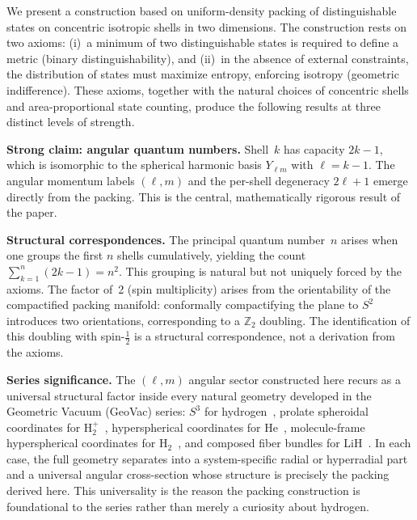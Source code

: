 \documentclass[aps,prl,reprint,amsmath,amssymb]{revtex4-2}
\begin{document}
We present a construction based on uniform-density packing of
distinguishable states on concentric isotropic shells in two
dimensions.  The construction rests on two axioms:
(i)~a minimum of two distinguishable states is required to define a
metric (binary distinguishability), and (ii)~in the absence of
external constraints, the distribution of states must maximize
entropy, enforcing isotropy (geometric indifference).  These axioms,
together with the natural choices of concentric shells and
area-proportional state counting, produce the following results at
three distinct levels of strength.

\medskip

\noindent\textbf{Strong claim: angular quantum numbers.}  Shell~$k$
has capacity $2k - 1$, which is isomorphic to the spherical harmonic
basis $Y_{\ell m}$ with $\ell = k - 1$.  The angular momentum labels
$(\ell, m)$ and the per-shell degeneracy $2\ell + 1$ emerge directly
from the packing.  This is the central, mathematically rigorous result
of the paper.

\medskip

\noindent\textbf{Structural correspondences.}  The principal quantum
number~$n$ arises when one groups the first $n$ shells cumulatively,
yielding the count $\sum_{k=1}^{n}(2k-1) = n^2$.  This grouping is
natural but not uniquely forced by the axioms.  The factor of~2 (spin
multiplicity) arises from the orientability of the compactified
packing manifold: conformally compactifying the plane to $S^2$
introduces two orientations, corresponding to a $\mathbb{Z}_2$
doubling.  The identification of this doubling with
spin-$\tfrac{1}{2}$ is a structural correspondence, not a derivation
from the axioms.

\medskip

\noindent\textbf{Series significance.}  The $(\ell, m)$ angular
sector constructed here recurs as a universal structural factor inside
every natural geometry developed in the Geometric Vacuum (GeoVac)
series: $S^3$ for hydrogen~\cite{paper7}, prolate spheroidal
coordinates for H$_2^+$~\cite{paper11}, hyperspherical coordinates for
He~\cite{paper13}, molecule-frame hyperspherical coordinates for
H$_2$~\cite{paper15}, and composed fiber bundles for
LiH~\cite{paper17}.  In each case, the full geometry separates into a
system-specific radial or hyperradial part and a universal angular
cross-section whose structure is precisely the packing derived here.
This universality is the reason the packing construction is
foundational to the series rather than merely a curiosity about
hydrogen.
\end{document}
